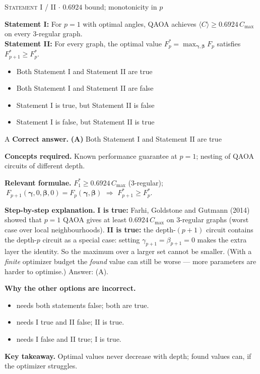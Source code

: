 \documentclass[11pt,a4paper]{article}
\newcommand{\optlabel}[1]{\textbf{(#1)}}
\newcommand{\correctlabel}[1]{\textcolor{okgreen}{\textbf{(#1)}\,\ding{51}}}
\newenvironment{qitem}[1]{\begin{list}{}{\setlength{\leftmargin}{3.3em}\setlength{\labelwidth}{3.1em}%
  \setlength{\labelsep}{0.2em}\setlength{\topsep}{3pt}\setlength{\parsep}{3pt}}\item[\textbf{Q.#1}\hfill]}{\end{list}}
\newcommand{\qsep}{\par\vspace{2pt}{\color{black!15}\hrule}\vspace{4pt}}
\newcommand{\qmeta}[2]{{\footnotesize\color{black!60}\textsc{#1} \;$\cdot$\; #2}\par}
\begin{document}
\begin{qitem}{49}
\qmeta{Statement I / II}{$0.6924$ bound; monotonicity in $p$}
\textbf{Statement I:} For $p = 1$ with optimal angles, QAOA achieves $\langle C\rangle \ge 0.6924\,C_{\max}$ on every 3-regular graph.\\[1mm]
\textbf{Statement II:} For every graph, the optimal value $F_p^* = \max_{\boldsymbol\gamma,\boldsymbol\beta}F_p$ satisfies $F_{p+1}^* \ge F_p^*$.
\begin{itemize}[leftmargin=2.6em, labelsep=0.4em, itemsep=2pt, topsep=3pt]
\item[\correctlabel{A}] Both Statement I and Statement II are true
\item[\optlabel{B}] Both Statement I and Statement II are false
\item[\optlabel{C}] Statement I is true, but Statement II is false
\item[\optlabel{D}] Statement I is false, but Statement II is true
\end{itemize}
\end{qitem}
\begin{solbox}{A}
\textbf{\color{brand}Correct answer.} \textcolor{okgreen}{\textbf{(A)}} Both Statement I and Statement II are true

\textbf{\color{brand}Concepts required.} Known performance guarantee at $p = 1$; nesting of QAOA circuits of different depth.

\textbf{\color{brand}Relevant formulae.} $F_1^* \ge 0.6924\,C_{\max}$ (3-regular); $\ F_{p+1}(\boldsymbol\gamma, 0, \boldsymbol\beta, 0) = F_p(\boldsymbol\gamma, \boldsymbol\beta)$ $\Rightarrow$ $F_{p+1}^* \ge F_p^*$.

\textbf{\color{brand}Step-by-step explanation.} \textbf{I is true:} Farhi, Goldstone and Gutmann (2014) showed that $p = 1$ QAOA gives at least $0.6924\,C_{\max}$ on
3-regular graphs (worst case over local neighbourhoods).
\textbf{II is true:} the depth-$(p+1)$ circuit contains the depth-$p$ circuit as a special case: setting $\gamma_{p+1} = \beta_{p+1} = 0$
makes the extra layer the identity. So the maximum over a larger set cannot be smaller. (With a \emph{finite} optimizer
budget the \emph{found} value can still be worse --- more parameters are harder to optimise.) Answer: (A).

\textbf{\color{brand}Why the other options are incorrect.}
\begin{itemize}[leftmargin=2.4em, itemsep=1pt, topsep=2pt]
\item[\textbf{(B)}] needs both statements false; both are true.
\item[\textbf{(C)}] needs I true and II false; II is true.
\item[\textbf{(D)}] needs I false and II true; I is true.
\end{itemize}
\textbf{\color{brand}Key takeaway.} Optimal values never decrease with depth; found values can, if the optimizer struggles.
\end{solbox}
\qsep
\end{document}
